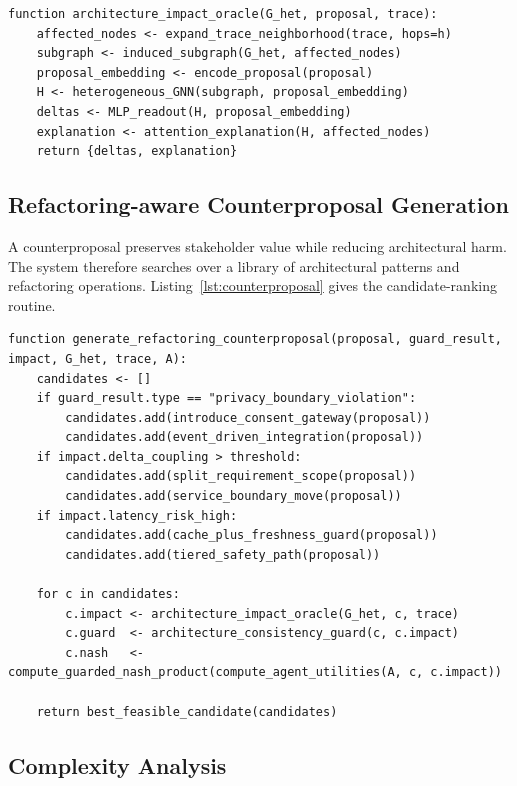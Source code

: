 \documentclass[english,preprint,nonatbib]{elsarticle}
\begin{document}
\begin{lstlisting}[caption={Architecture impact oracle.},label={lst:impact-oracle}]
function architecture_impact_oracle(G_het, proposal, trace):
    affected_nodes <- expand_trace_neighborhood(trace, hops=h)
    subgraph <- induced_subgraph(G_het, affected_nodes)
    proposal_embedding <- encode_proposal(proposal)
    H <- heterogeneous_GNN(subgraph, proposal_embedding)
    deltas <- MLP_readout(H, proposal_embedding)
    explanation <- attention_explanation(H, affected_nodes)
    return {deltas, explanation}
\end{lstlisting}

\subsection{Refactoring-aware Counterproposal Generation}

A counterproposal preserves stakeholder value while reducing architectural harm.
The system therefore searches over a library of architectural patterns and refactoring operations. Listing~\ref{lst:counterproposal} gives the candidate-ranking routine.

\begin{lstlisting}[caption={Refactoring-aware counterproposal search.},label={lst:counterproposal}]
function generate_refactoring_counterproposal(proposal, guard_result, impact, G_het, trace, A):
    candidates <- []
    if guard_result.type == "privacy_boundary_violation":
        candidates.add(introduce_consent_gateway(proposal))
        candidates.add(event_driven_integration(proposal))
    if impact.delta_coupling > threshold:
        candidates.add(split_requirement_scope(proposal))
        candidates.add(service_boundary_move(proposal))
    if impact.latency_risk_high:
        candidates.add(cache_plus_freshness_guard(proposal))
        candidates.add(tiered_safety_path(proposal))

    for c in candidates:
        c.impact <- architecture_impact_oracle(G_het, c, trace)
        c.guard  <- architecture_consistency_guard(c, c.impact)
        c.nash   <- compute_guarded_nash_product(compute_agent_utilities(A, c, c.impact))

    return best_feasible_candidate(candidates)
\end{lstlisting}

\subsection{Complexity Analysis}
\end{document}
